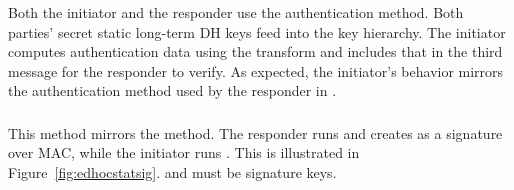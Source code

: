 \subsubsection{\mStatStat}
Both the initiator and the responder use the \mStat{}
authentication method.
%
Both parties' secret static long-term DH keys feed into the key hierarchy.
%
The initiator computes authentication data using the \mAead{} transform
and includes that in the third message for the responder to verify.
%
As expected, the initiator's behavior mirrors the \mStat{} authentication method used by the responder in \mSigStat{}.
%

\spacehack
\subsubsection{\mStatSig}
This method mirrors the \mSigStat{} method.
%
The responder runs \mSig{} and creates \mAuthr{} as a signature over MAC, while the initiator runs \mStat{}.
%
This is illustrated in Figure~\ref{fig:edhocstatsig}. \mCredr{} and \mLtkr{} must be signature keys.
%

